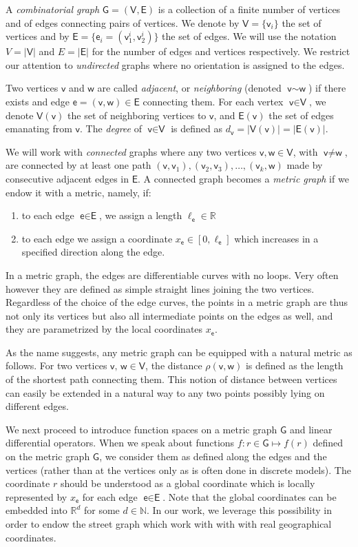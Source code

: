 \documentclass[11pt,a4paper,twoside]{article}
\theoremstyle{definition}
\numberwithin{equation}{section}
\newcommand{\bN}{\ensuremath{\mathbb{N}}}
\newcommand{\bR}{\ensuremath{\mathbb{R}}}
\newcommand{\G}{\ensuremath{\textsf{G}}} %
\newcommand{\E}{\ensuremath{\textsf{E}}} %
\newcommand{\V}{\ensuremath{\textsf{V}}} %
\newcommand{\vv}{\ensuremath{\textsf{v}}}
\newcommand{\ww}{\ensuremath{\textsf{w}}}
\newcommand{\ee}{\ensuremath{\textsf{e}}}
\newcommand{\<}{\langle}
\renewcommand{\>}{\rangle}
\begin{document}
A \emph{combinatorial graph} $\G = (\V, \E)$ is a collection of a finite number of vertices and of edges connecting pairs of vertices. We denote by $\V=\{\vv_i\}$ the set of vertices and by $\E=\{\ee_i=(\vv_1^i, \vv_2^i) \}$ the set of edges. We will use the notation $V = |\V|$ and $E=|\E|$ for the number of edges and vertices respectively. We restrict our attention to \emph{undirected} graphs where no orientation is assigned to the edges. %

Two vertices $\vv$ and $\ww$ are called \emph{adjacent}, or \emph{neighboring} (denoted $\vv\sim \ww$) if there exists and edge $\ee=(\vv,\ww)\in \E$ connecting them. For each vertex $\vv\in \V$, we denote $\V(\vv)$ the set of neighboring vertices to $\vv$, and $\E(\vv)$ the set of edges emanating from $\vv$. The \emph{degree} of $\vv\in \V$ is defined as $d_\vv = | \V(\vv)| = |\E(\vv)|$.

We will work with \emph{connected} graphs where any two vertices $\vv, \ww\in\V$, with $\vv\neq \ww$, are connected by at least one path $(\vv, \vv_1), (\vv_2, \vv_3),\dots, (\vv_k, \ww)$ made by consecutive adjacent edges in $\E$. A connected graph becomes a \emph{metric graph} if we endow it with a metric, namely, if:
\begin{enumerate}
      \item to each edge $\ee\in\E$, we assign a length $\ell_\ee \in \bR$
      \item to each edge we assign a coordinate $x_\ee \in [0, \ell_\ee]$ which increases in a specified direction along the edge.
\end{enumerate}
In a metric graph, the edges are differentiable curves with no loops. Very often however they are defined as simple straight lines joining the two vertices. Regardless of the choice of the edge curves, the points in a metric graph are thus not only its vertices but also all intermediate points on the edges as well, and they are parametrized by the local coordinates $x_\ee$.

As the name suggests, any metric graph can be equipped with a natural metric as follows. For two vertices $\vv,\,\ww\in \V$, the distance $\rho(\vv,\ww)$ is defined as the length of the shortest path connecting them. This notion of distance between vertices can easily be extended in a natural way to any two points possibly lying on different edges.

We next proceed to introduce function spaces on a metric graph $\G$ and linear differential operators. When we speak about functions $f:r\in \G\mapsto f(r)$ defined on the metric graph $\G$, we consider them as defined along the edges and the vertices (rather than at the vertices only as is often done in discrete models). The coordinate $r$ should be understood as a global coordinate which is locally represented by $x_\ee$ for each edge $\ee\in \E$. Note that the global coordinates can be embedded into $\bR^d$ for some $d\in \bN$. In our work, we leverage this possibility in order to endow the street graph which work with with with real geographical coordinates.
\end{document}
